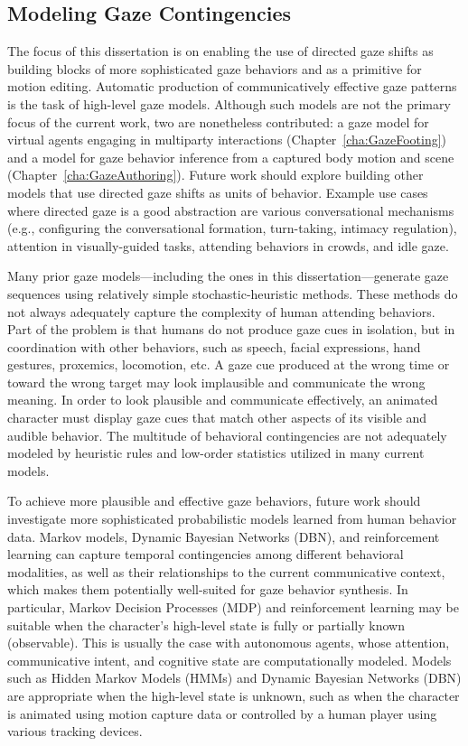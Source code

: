 \subsection{Modeling Gaze Contingencies}

The focus of this dissertation is on enabling the use of directed gaze shifts as building blocks of more sophisticated gaze behaviors and as a primitive for motion editing. Automatic production of communicatively effective gaze patterns is the task of high-level gaze models. Although such models are not the primary focus of the current work, two are nonetheless contributed: a gaze model for virtual agents engaging in multiparty interactions (Chapter~\ref{cha:GazeFooting}) and a model for gaze behavior inference from a captured body motion and scene (Chapter~\ref{cha:GazeAuthoring}). Future work should explore building other models that use directed gaze shifts as units of behavior. Example use cases where directed gaze is a good abstraction are various conversational mechanisms (e.g., configuring the conversational formation, turn-taking, intimacy regulation), attention in visually-guided tasks, attending behaviors in crowds, and idle gaze.

Many prior gaze models---including the ones in this dissertation---generate gaze sequences using relatively simple stochastic-heuristic methods. These methods do not always adequately capture the complexity of human attending behaviors. Part of the problem is that humans do not produce gaze cues in isolation, but in coordination with other behaviors, such as speech, facial expressions, hand gestures, proxemics, locomotion, etc. A gaze cue produced at the wrong time or toward the wrong target may look implausible and communicate the wrong meaning. In order to look plausible and communicate effectively, an animated character must display gaze cues that match other aspects of its visible and audible behavior. The multitude of behavioral contingencies are not adequately modeled by heuristic rules and low-order statistics utilized in many current models.

To achieve more plausible and effective gaze behaviors, future work should investigate more sophisticated probabilistic models learned from human behavior data. Markov models, Dynamic Bayesian Networks (DBN), and reinforcement learning can capture temporal contingencies among different behavioral modalities, as well as their relationships to the current communicative context, which makes them potentially well-suited for gaze behavior synthesis. In particular, Markov Decision Processes (MDP) and reinforcement learning may be suitable when the character's high-level state is fully or partially known (observable). This is usually the case with autonomous agents, whose attention, communicative intent, and cognitive state are computationally modeled. Models such as Hidden Markov Models (HMMs) and Dynamic Bayesian Networks (DBN) are appropriate when the high-level state is unknown, such as when the character is animated using motion capture data or controlled by a human player using various tracking devices.

